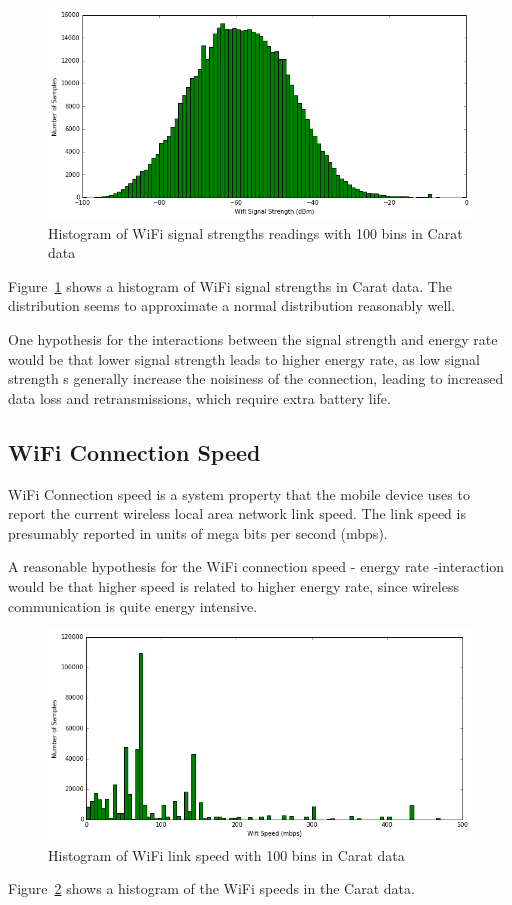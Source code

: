  \begin{figure}[!htbp]
	\centering
	\includegraphics[width=\textwidth]{images/carat-data/wifi_signal_strength.png}
	\caption{Histogram of WiFi signal strengths readings with 100 bins in Carat data}
	\label{figure:carat-data-wifi-signal-strength}
\end{figure} 

Figure~\ref{figure:carat-data-wifi-signal-strength} shows a histogram of WiFi signal strengths in Carat data. The distribution seems to approximate a normal distribution reasonably well. 

One hypothesis for the interactions between the signal strength and energy rate would be that lower signal strength leads to higher energy rate, as low signal strength s generally increase the noisiness of the connection, leading to increased data loss and retransmissions, which require extra battery life.

\subsection{WiFi Connection Speed}

WiFi Connection speed is a system property that the mobile device uses to report the current wireless local area network link speed. The link speed is presumably reported in units of mega bits per second (mbps). 

A reasonable hypothesis for the WiFi connection speed - energy rate -interaction would be that higher speed is related to higher energy rate, since wireless communication is quite energy intensive. 

 \begin{figure}[!htbp]
	\centering
	\includegraphics[width=\textwidth]{images/carat-data/wifi_speed.png}
	\caption{Histogram of WiFi link speed with 100 bins in Carat data}
	\label{figure:carat-data-wifi-speed}
\end{figure}

Figure~\ref{figure:carat-data-wifi-speed} shows a histogram of the WiFi speeds in the Carat data. 